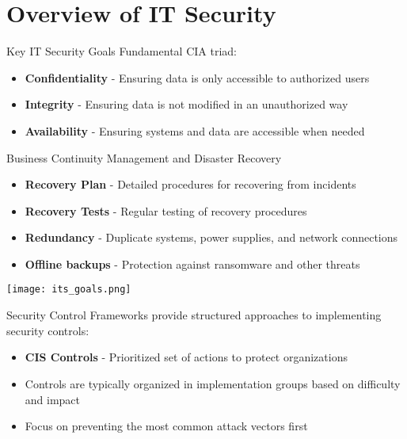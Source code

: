 


\section{Overview of IT Security}

\small

\begin{minipage}{0.7\linewidth}
\begin{definition}{Key IT Security Goals}
Fundamental CIA triad:
\begin{itemize}
    \item \textbf{Confidentiality} - Ensuring data is only accessible to authorized users
    \item \textbf{Integrity} - Ensuring data is not modified in an unauthorized way
    \item \textbf{Availability} - Ensuring systems and data are accessible when needed
\end{itemize}
\end{definition}

\begin{theorem}{Business Continuity Management and Disaster Recovery}
\begin{itemize}
    \item \textbf{Recovery Plan} - Detailed procedures for recovering from incidents
    \item \textbf{Recovery Tests} - Regular testing of recovery procedures
    \item \textbf{Redundancy} - Duplicate systems, power supplies, and network connections
    \item \textbf{Offline backups} - Protection against ransomware and other threats
\end{itemize}
\end{theorem}


\end{minipage}
\begin{minipage}{0.3\linewidth}
\texttt{[image: its\_goals.png]}
\end{minipage}



\raggedcolumns


\begin{concept}{Security Control Frameworks}
provide structured approaches to implementing security controls:
\begin{itemize}
    \item \textbf{CIS Controls} - Prioritized set of actions to protect organizations
    \item Controls are typically organized in implementation groups based on difficulty and impact
    \item Focus on preventing the most common attack vectors first
\end{itemize}
\end{concept}

